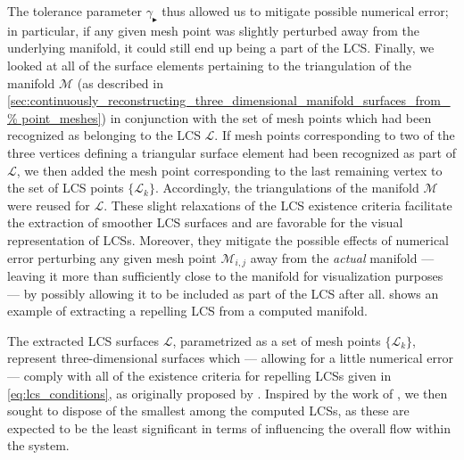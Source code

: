 The tolerance parameter $\gamma_{\blacktriangleright}$ thus allowed us to mitigate
possible numerical error; in particular, if any given mesh point was slightly
perturbed away from the underlying manifold, it could still end up being a part
of the LCS. Finally, we looked at all of the surface elements pertaining to the
triangulation of the manifold $\mathcal{M}$ (as described in
\cref{sec:continuously_reconstructing_three_dimensional_manifold_surfaces_from_%
point_meshes}) in conjunction with the set of mesh points which had been
recognized as belonging to the LCS $\mathcal{L}$. If mesh points corresponding
to two of the three vertices defining a triangular surface element had been
recognized as part of $\mathcal{L}$, we then added the mesh point corresponding
to the last remaining vertex to the set of LCS points $\{\mathcal{L}_{k}\}$.
Accordingly, the triangulations of the manifold $\mathcal{M}$ were reused for
$\mathcal{L}$. These slight relaxations of the LCS existence criteria
facilitate the extraction of smoother LCS surfaces and are favorable for the
visual representation of LCSs. Moreover, they mitigate the possible effects of
numerical error perturbing any given mesh point $\mathcal{M}_{i,j}$ away from
the \emph{actual} manifold --- leaving it more than sufficiently close to the
manifold for visualization purposes --- by possibly allowing it to be included
as part of the LCS after all.  shows an
example of extracting a repelling LCS from a computed manifold.



The extracted LCS surfaces $\mathcal{L}$, parametrized as a set of mesh points
$\{\mathcal{L}_{k}\}$, represent three-dimensional surfaces which --- allowing
for a little numerical error --- comply with all of the existence criteria
for repelling LCSs given in \cref{eq:lcs_conditions}, as originally proposed by
\textcite{haller2011variational}. Inspired by the work of
\textcite{farazmand2012computing}, we then sought to dispose of the smallest
among the computed LCSs, as these are expected to be the least significant in
terms of influencing the overall flow within the system.

